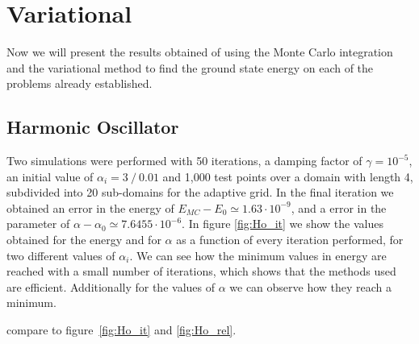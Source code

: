 
\section{Variational}
Now we will present the results obtained of using the Monte Carlo integration and the variational
method to find the ground state energy on each of the problems already established.

\subsection{Harmonic Oscillator}
Two simulations were performed with 50 iterations, a damping factor of $\gamma = 10^{-5}$, an initial value of $\alpha_i = 3~/~ 0.01$  and 1,000 test points over a domain with length 4, subdivided into 20 sub-domains for the adaptive grid. In the final iteration we obtained an  error in the energy of $E_{MC}-E_0 \simeq 1.63\cdot 10^{-9}$,
and a error in the parameter of $\alpha - \alpha_0 \simeq 7.6455\cdot 10^{-6}$. In figure \ref{fig:Ho_it}
we show the values obtained for the energy and for $\alpha$ as a function of every iteration performed, for two different values of $\alpha_i$. We can see how the minimum values in energy are reached with a small number of iterations, which shows that the methods used are efficient. Additionally for the values of $\alpha$ we can observe how they reach a minimum.


compare to figure~\ref{fig:Ho_it} and \ref{fig:Ho_rel}.

